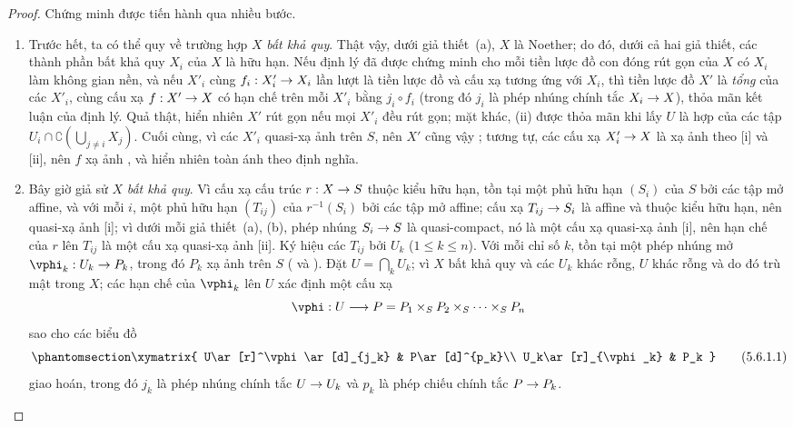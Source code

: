 \documentclass[oneside,10pt]{amsart}
\makeatletter
\renewcommand{\leq}{\leqslant}
\newcommand{\ega@arrow}[2]{\mathchoice{#1}{#2}{#2}{#2}}
\renewcommand{\to}{\ega@arrow{\longrightarrow}{\rightarrow}}
\newcommand{\oldpage}[2][]{\marginnote{\normalfont\footnotesize\textbf{#1}~|~#2}\ignorespaces}
\let\EGAOriginalLabel\label
\renewcommand{\label}[1]{\phantomsection\EGAOriginalLabel{#1}}
\makeatother
\begin{document}
\begin{proof}
Chứng minh được tiến hành qua nhiều bước.
\begin{enumerate}
  \item[(A)] Trước hết, ta có thể quy về trường hợp $X$ \emph{bất khả quy}.
    Thật vậy, dưới giả thiết~(a), $X$ là Noether; do đó, dưới cả hai giả thiết, các thành phần bất khả quy $X_i$ của $X$ là hữu hạn.
    Nếu định lý đã được chứng minh cho mỗi tiền lược đồ con đóng rút gọn của $X$ có $X_i$ làm không gian nền, và nếu $X'_i$ cùng $f_i:X'_i\to X_i$ lần lượt là tiền lược đồ và cấu xạ tương ứng với $X_i$, thì tiền lược đồ $X'$ là \emph{tổng} của các $X'_i$, cùng cấu xạ $f:X'\to X$ có hạn chế trên mỗi $X'_i$ bằng $j_i\circ f_i$ (trong đó $j_i$ là phép nhúng chính tắc $X_i\to X$), thỏa mãn kết luận của định lý.
    Quả thật, hiển nhiên $X'$ rút gọn nếu mọi $X'_i$ đều rút gọn; mặt khác, (ii) được thỏa mãn khi lấy $U$ là hợp của các tập $U_i\cap\complement\left(\bigcup_{j\neq i}X_j\right)$.
    Cuối cùng, vì các $X'_i$ quasi-xạ ảnh trên $S$, nên $X'$ cũng vậy
\oldpage[II]{107}
    ; tương tự, các cấu xạ $X'_i\to X$ là xạ ảnh theo [i] và [ii], nên $f$ xạ ảnh , và hiển nhiên toàn ánh theo định nghĩa.
  \item[(B)] Bây giờ giả sử $X$ \emph{bất khả quy}.
    Vì cấu xạ cấu trúc $r:X\to S$ thuộc kiểu hữu hạn, tồn tại một phủ hữu hạn $(S_i)$ của $S$ bởi các tập mở affine, và với mỗi $i$, một phủ hữu hạn $(T_{ij})$ của $r^{-1}(S_i)$ bởi các tập mở affine; cấu xạ $T_{ij}\to S_i$ là affine và thuộc kiểu hữu hạn, nên quasi-xạ ảnh [i];
    vì dưới mỗi giả thiết~(a), (b), phép nhúng $S_i\to S$ là quasi-compact, nó là một cấu xạ quasi-xạ ảnh [i], nên hạn chế của $r$ lên $T_{ij}$ là một cấu xạ quasi-xạ ảnh [ii].
    Ký hiệu các $T_{ij}$ bởi $U_k$ ($1\leq k\leq n$).
    Với mỗi chỉ số $k$, tồn tại một phép nhúng mở $\vphi_k:U_k\to P_k$, trong đó $P_k$ xạ ảnh trên $S$ ( và ).
    Đặt $U=\bigcap_k U_k$; vì $X$ bất khả quy và các $U_k$ khác rỗng, $U$ khác rỗng và do đó trù mật trong $X$; các hạn chế của $\vphi_k$ lên $U$ xác định một cấu xạ
    \[
      \vphi:U\to P=P_1\times_S P_2\times_S\cdots\times_S P_n
    \]
    sao cho các biểu đồ
    \[
    \label{II.5.6.1.1}
      \xymatrix{
        U\ar[r]^\vphi\ar[d]_{j_k} &
        P\ar[d]^{p_k}\\
        U_k\ar[r]_{\vphi_k} &
        P_k
      }
      \tag{5.6.1.1}
    \]
    giao hoán, trong đó $j_k$ là phép nhúng chính tắc $U\to U_k$ và $p_k$ là phép chiếu chính tắc $P\to P_k$.

\end{enumerate}
\end{proof}
\end{document}
